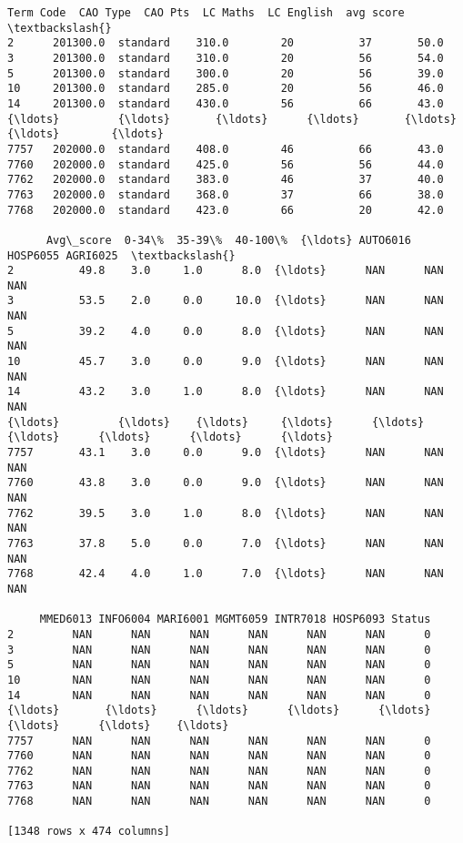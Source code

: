\documentclass[11pt]{article}
\makeatletter
\newcommand{\boxspacing}{\kern\kvtcb@left@rule\kern\kvtcb@boxsep}
\newcommand{\prompt}[4]{
        \ttfamily\llap{{\color{#2}[#3]:\hspace{3pt}#4}}\vspace{-\baselineskip}
    }
\makeatother
\begin{document}
            \begin{tcolorbox}[breakable, size=fbox, boxrule=.5pt, pad at break*=1mm, opacityfill=0]
\prompt{Out}{outcolor}{39}{\boxspacing}
\begin{Verbatim}[commandchars=\\\{\}]
      Term Code  CAO Type  CAO Pts  LC Maths  LC English  avg score  \textbackslash{}
2      201300.0  standard    310.0        20          37       50.0
3      201300.0  standard    310.0        20          56       54.0
5      201300.0  standard    300.0        20          56       39.0
10     201300.0  standard    285.0        20          56       46.0
14     201300.0  standard    430.0        56          66       43.0
{\ldots}         {\ldots}       {\ldots}      {\ldots}       {\ldots}         {\ldots}        {\ldots}
7757   202000.0  standard    408.0        46          66       43.0
7760   202000.0  standard    425.0        56          56       44.0
7762   202000.0  standard    383.0        46          37       40.0
7763   202000.0  standard    368.0        37          66       38.0
7768   202000.0  standard    423.0        66          20       42.0

      Avg\_score  0-34\%  35-39\%  40-100\%  {\ldots} AUTO6016 HOSP6055 AGRI6025  \textbackslash{}
2          49.8    3.0     1.0      8.0  {\ldots}      NAN      NAN      NAN
3          53.5    2.0     0.0     10.0  {\ldots}      NAN      NAN      NAN
5          39.2    4.0     0.0      8.0  {\ldots}      NAN      NAN      NAN
10         45.7    3.0     0.0      9.0  {\ldots}      NAN      NAN      NAN
14         43.2    3.0     1.0      8.0  {\ldots}      NAN      NAN      NAN
{\ldots}         {\ldots}    {\ldots}     {\ldots}      {\ldots}  {\ldots}      {\ldots}      {\ldots}      {\ldots}
7757       43.1    3.0     0.0      9.0  {\ldots}      NAN      NAN      NAN
7760       43.8    3.0     0.0      9.0  {\ldots}      NAN      NAN      NAN
7762       39.5    3.0     1.0      8.0  {\ldots}      NAN      NAN      NAN
7763       37.8    5.0     0.0      7.0  {\ldots}      NAN      NAN      NAN
7768       42.4    4.0     1.0      7.0  {\ldots}      NAN      NAN      NAN

     MMED6013 INFO6004 MARI6001 MGMT6059 INTR7018 HOSP6093 Status
2         NAN      NAN      NAN      NAN      NAN      NAN      0
3         NAN      NAN      NAN      NAN      NAN      NAN      0
5         NAN      NAN      NAN      NAN      NAN      NAN      0
10        NAN      NAN      NAN      NAN      NAN      NAN      0
14        NAN      NAN      NAN      NAN      NAN      NAN      0
{\ldots}       {\ldots}      {\ldots}      {\ldots}      {\ldots}      {\ldots}      {\ldots}    {\ldots}
7757      NAN      NAN      NAN      NAN      NAN      NAN      0
7760      NAN      NAN      NAN      NAN      NAN      NAN      0
7762      NAN      NAN      NAN      NAN      NAN      NAN      0
7763      NAN      NAN      NAN      NAN      NAN      NAN      0
7768      NAN      NAN      NAN      NAN      NAN      NAN      0

[1348 rows x 474 columns]
\end{Verbatim}
\end{tcolorbox}
        
\end{document}
